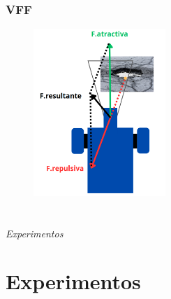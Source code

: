 \documentclass{beamer}
\begin{document}
\begin{frame}
	\frametitle{VFF}
	\begin{figure}
		\centering
		\includegraphics[width=5cm]{figs/vff.png}
	\end{figure}
	
\end{frame}
\section*{}
\begin{frame}{}
	\centering \Huge
	\emph{Experimentos}
\end{frame}

\section{Experimentos}
\begin{frame}
\end{frame}

\begin{frame}
\end{frame}
\end{document}
